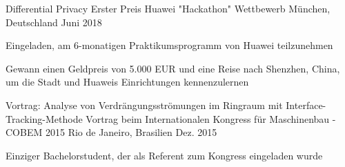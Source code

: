 

\begin{cventries}


\cventry
{Differential Privacy} %
{Erster Preis Huawei "Hackathon" Wettbewerb} %
{München, Deutschland} %
{Juni 2018} %
{ %
\begin{cvitems}
\item {Eingeladen, am 6-monatigen Praktikumsprogramm von Huawei teilzunehmen}
\item {Gewann einen Geldpreis von 5.000 EUR und eine Reise nach Shenzhen, China, um die Stadt und Huaweis Einrichtungen kennenzulernen}
\end{cvitems}
}

\cventry
{Vortrag: Analyse von Verdrängungsströmungen im Ringraum mit Interface-Tracking-Methode} %
{Vortrag beim Internationalen Kongress für Maschinenbau - COBEM 2015} %
{Rio de Janeiro, Brasilien} %
{Dez. 2015} %
{ %
\begin{cvitems}
\item {Einziger Bachelorstudent, der als Referent zum Kongress eingeladen wurde}
\end{cvitems}
}


\end{cventries}
